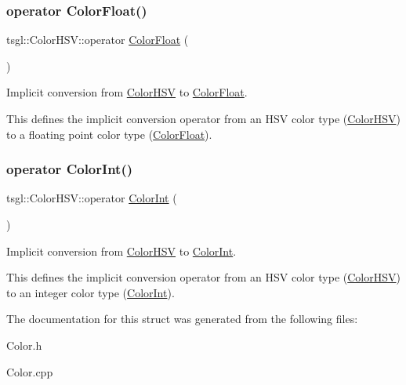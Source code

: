 \subsubsection{\texorpdfstring{operator Color\+Float()}{operator ColorFloat()}}
{\footnotesize\ttfamily tsgl\+::\+Color\+H\+S\+V\+::operator \hyperlink{structtsgl_1_1_color_float}{Color\+Float} (\begin{DoxyParamCaption}{ }\end{DoxyParamCaption})}



Implicit conversion from \hyperlink{structtsgl_1_1_color_h_s_v}{Color\+H\+SV} to \hyperlink{structtsgl_1_1_color_float}{Color\+Float}. 

This defines the implicit conversion operator from an H\+SV color type (\hyperlink{structtsgl_1_1_color_h_s_v}{Color\+H\+SV}) to a floating point color type (\hyperlink{structtsgl_1_1_color_float}{Color\+Float}). \mbox{\label{structtsgl_1_1_color_h_s_v_acac3e7bf684bd8b518ab794ca8bedbf7}} 
\subsubsection{\texorpdfstring{operator Color\+Int()}{operator ColorInt()}}
{\footnotesize\ttfamily tsgl\+::\+Color\+H\+S\+V\+::operator \hyperlink{structtsgl_1_1_color_int}{Color\+Int} (\begin{DoxyParamCaption}{ }\end{DoxyParamCaption})}



Implicit conversion from \hyperlink{structtsgl_1_1_color_h_s_v}{Color\+H\+SV} to \hyperlink{structtsgl_1_1_color_int}{Color\+Int}. 

This defines the implicit conversion operator from an H\+SV color type (\hyperlink{structtsgl_1_1_color_h_s_v}{Color\+H\+SV}) to an integer color type (\hyperlink{structtsgl_1_1_color_int}{Color\+Int}). 

The documentation for this struct was generated from the following files\+:\begin{DoxyCompactItemize}
\item 
Color.\+h\item 
Color.\+cpp\end{DoxyCompactItemize}
